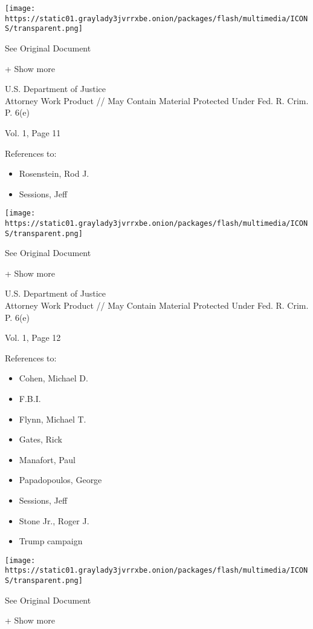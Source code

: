 \protect\hyperlink{}{}

\texttt{[image: https://static01.graylady3jvrrxbe.onion/packages/flash/multimedia/ICONS/transparent.png]}

See Original Document

+ Show more

U.S. Department of Justice\\
Attorney Work Product // May Contain Material Protected Under Fed. R.
Crim. P. 6(e)

Vol. 1, Page 11

References to:

\begin{itemize}
\tightlist
\item
  Rosenstein, Rod J.
\item
  Sessions, Jeff
\end{itemize}

\protect\hyperlink{}{}

\texttt{[image: https://static01.graylady3jvrrxbe.onion/packages/flash/multimedia/ICONS/transparent.png]}

See Original Document

+ Show more

U.S. Department of Justice\\
Attorney Work Product // May Contain Material Protected Under Fed. R.
Crim. P. 6(e)

Vol. 1, Page 12

References to:

\begin{itemize}
\tightlist
\item
  Cohen, Michael D.
\item
  F.B.I.
\item
  Flynn, Michael T.
\item
  Gates, Rick
\item
  Manafort, Paul 
\item
  Papadopoulos, George
\item
  Sessions, Jeff
\item
  Stone Jr., Roger J.
\item
  Trump campaign
\end{itemize}

\protect\hyperlink{}{}

\texttt{[image: https://static01.graylady3jvrrxbe.onion/packages/flash/multimedia/ICONS/transparent.png]}

See Original Document

+ Show more

